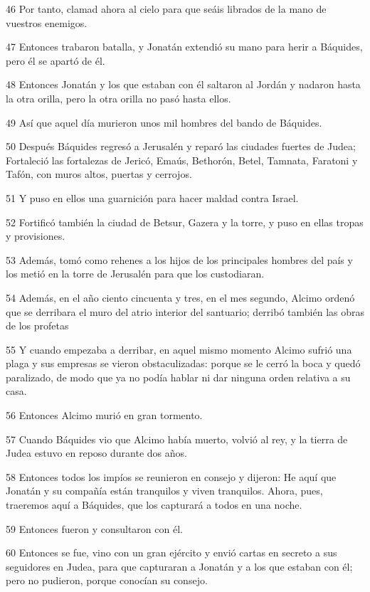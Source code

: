 \par 46 Por tanto, clamad ahora al cielo para que seáis librados de la mano de vuestros enemigos.
\par 47 Entonces trabaron batalla, y Jonatán extendió su mano para herir a Báquides, pero él se apartó de él.
\par 48 Entonces Jonatán y los que estaban con él saltaron al Jordán y nadaron hasta la otra orilla, pero la otra orilla no pasó hasta ellos.
\par 49 Así que aquel día murieron unos mil hombres del bando de Báquides.
\par 50 Después Báquides regresó a Jerusalén y reparó las ciudades fuertes de Judea; Fortaleció las fortalezas de Jericó, Emaús, Bethorón, Betel, Tamnata, Faratoni y Tafón, con muros altos, puertas y cerrojos.
\par 51 Y puso en ellos una guarnición para hacer maldad contra Israel.
\par 52 Fortificó también la ciudad de Betsur, Gazera y la torre, y puso en ellas tropas y provisiones.
\par 53 Además, tomó como rehenes a los hijos de los principales hombres del país y los metió en la torre de Jerusalén para que los custodiaran.
\par 54 Además, en el año ciento cincuenta y tres, en el mes segundo, Alcimo ordenó que se derribara el muro del atrio interior del santuario; derribó también las obras de los profetas
\par 55 Y cuando empezaba a derribar, en aquel mismo momento Alcimo sufrió una plaga y sus empresas se vieron obstaculizadas: porque se le cerró la boca y quedó paralizado, de modo que ya no podía hablar ni dar ninguna orden relativa a su casa.
\par 56 Entonces Alcimo murió en gran tormento.
\par 57 Cuando Báquides vio que Alcimo había muerto, volvió al rey, y la tierra de Judea estuvo en reposo durante dos años.
\par 58 Entonces todos los impíos se reunieron en consejo y dijeron: He aquí que Jonatán y su compañía están tranquilos y viven tranquilos. Ahora, pues, traeremos aquí a Báquides, que los capturará a todos en una noche.
\par 59 Entonces fueron y consultaron con él.
\par 60 Entonces se fue, vino con un gran ejército y envió cartas en secreto a sus seguidores en Judea, para que capturaran a Jonatán y a los que estaban con él; pero no pudieron, porque conocían su consejo.
